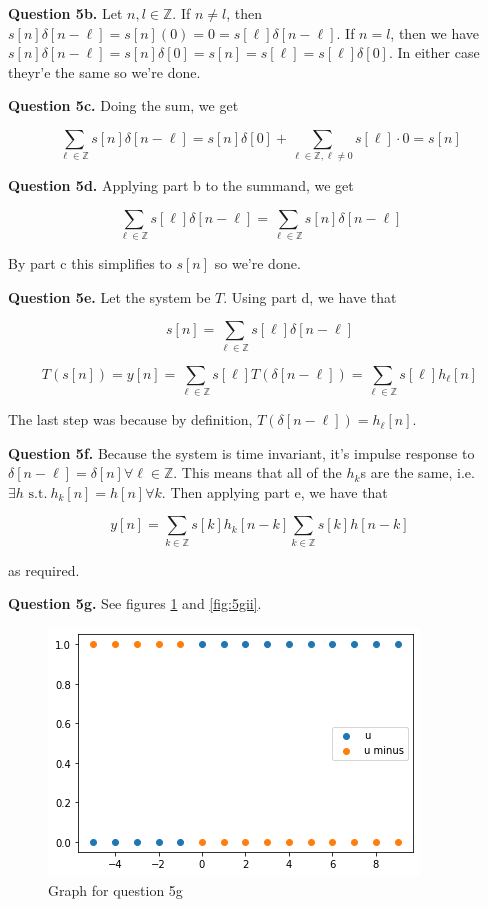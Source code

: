 \documentclass[letterpaper, reqno,11pt]{article}
\newcommand{\ZZ}{\mathbb{Z}}
\newcommand{\st}{\text{ s.t.}\ }
\begin{document}
{\noindent\bf Question 5b.} Let $n, l\in\ZZ$. If $n\neq l$, then $s[n]\delta[n-\ell]=s[n](0)=0=s[\ell]\delta[n-\ell]$. If $n=l$, then we have $s[n]\delta[n-\ell]=s[n]\delta[0]=s[n]=s[\ell]=s[\ell]\delta[0]$. In either case theyr'e the same so we're done. 

{\noindent\bf Question 5c.} Doing the sum, we get 

$$
    \sum_{\ell\in\ZZ}s[n]\delta[n-\ell]=s[n]\delta[0]+\sum_{\ell\in\ZZ,\ell\neq0}s[\ell]\cdot 0=s[n]
$$

{\noindent\bf Question 5d.} Applying part b to the summand, we get 

$$
    \sum_{\ell\in\ZZ} s[\ell]\delta[n-\ell]=\sum_{\ell\in\ZZ}s[n]\delta[n-\ell]
$$

By part c this simplifies to $s[n]$ so we're done. 

{\noindent\bf Question 5e.} Let the system be $T$. Using part d, we have that 

$$
    s[n]=\sum_{\ell\in\ZZ}s[\ell]\delta[n-\ell]
$$

$$
    T(s[n])=y[n]=\sum_{\ell\in\ZZ}s[\ell]T(\delta[n-\ell])=\sum_{\ell\in\ZZ}s[\ell]h_\ell[n]
$$

The last step was because by definition, $T(\delta[n-\ell])=h_\ell[n]$. 

{\noindent\bf Question 5f.} Because the system is time invariant, it's impulse response to $\delta[n-\ell]=\delta[n]\forall\ell\in\ZZ$. This means that all of the $h_k$s are the same, i.e. $\exists h\st h_k[n]=h[n]\forall k$. Then applying part e, we have that 

$$
    y[n]=\sum_{k\in\ZZ}s[k]h_k[n-k]\sum_{k\in\ZZ}s[k]h[n-k]
$$

as required. 

{\noindent\bf Question 5g.} See figures \ref{fig:5gi} and \ref{fig:5gii}. 

\begin{figure}[htbp]
\centering
\includegraphics[width=\textwidth]{5gi}
\caption{Graph for question 5g}
\label{fig:5gi}
\end{figure}
\end{document}
